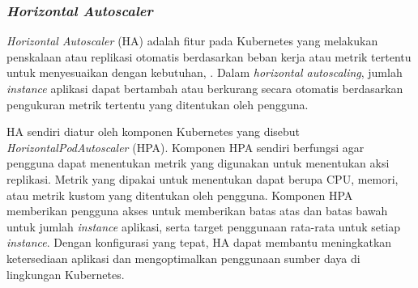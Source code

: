 \subsubsection{\textit{Horizontal Autoscaler}}
\textit{Horizontal Autoscaler} (HA) adalah fitur pada Kubernetes yang melakukan penskalaan atau replikasi otomatis berdasarkan beban kerja atau metrik tertentu untuk menyesuaikan dengan kebutuhan, \parencite{hpa}. Dalam \textit{horizontal autoscaling}, jumlah \textit{instance} aplikasi dapat bertambah atau berkurang secara otomatis berdasarkan pengukuran metrik tertentu yang ditentukan oleh pengguna.

HA sendiri diatur oleh komponen Kubernetes yang disebut \textit{HorizontalPodAutoscaler} (HPA). Komponen HPA sendiri berfungsi agar pengguna dapat menentukan metrik yang digunakan untuk menentukan aksi replikasi. Metrik yang dipakai untuk menentukan dapat berupa CPU, memori, atau metrik kustom yang ditentukan oleh pengguna. Komponen HPA memberikan pengguna akses untuk memberikan batas atas dan batas bawah untuk jumlah \textit{instance} aplikasi, serta target penggunaan rata-rata untuk setiap \textit{instance}. Dengan konfigurasi yang tepat, HA dapat membantu meningkatkan ketersediaan aplikasi dan mengoptimalkan penggunaan sumber daya di lingkungan Kubernetes.